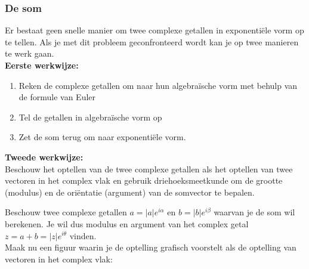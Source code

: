 \subsubsection{De som}

Er bestaat geen snelle manier om twee complexe getallen in exponenti\"{e}le vorm op te tellen. Als je met dit probleem geconfronteerd wordt kan je op twee manieren te werk gaan.\\

{\bf Eerste werkwijze:} \\

\begin{enumerate}
	\item Reken de complexe getallen om naar hun algebra\"{i}sche vorm met behulp van de formule van Euler
	\item Tel de getallen in algebra\"{i}sche vorm op
	\item Zet de som terug om naar exponenti\"{e}le vorm.
\end{enumerate}

\vspace{0.3cm}

{\bf Tweede werkwijze:} \\

Beschouw het optellen van de twee complexe getallen als het optellen van twee vectoren in het complex vlak en gebruik driehoeksmeetkunde om de grootte (modulus) en de ori\"{e}ntatie (argument) van de somvector te bepalen.\\

\vspace{0.3cm}

Beschouw twee complexe getallen $a=|a|e^{i\alpha}$ en $b=|b|e^{i\beta}$ waarvan je de som wil berekenen. Je wil dus modulus en argument van het complex getal $z=a+b=|z|e^{i\theta}$ vinden.\\
Maak nu een figuur waarin je de optelling grafisch voorstelt als de optelling van vectoren in het complex vlak:\\

